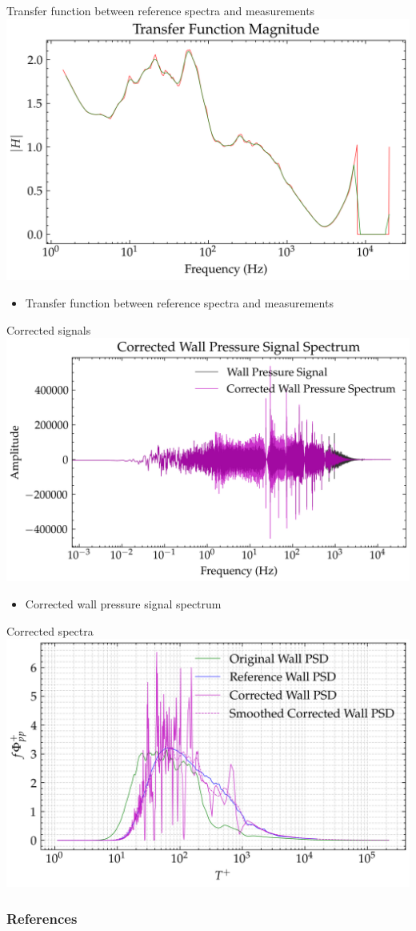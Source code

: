 \documentclass[aspectratio=169]{beamer}
\begin{document}
\begin{frame}{Transfer function between reference spectra and measurements}
    \centering
    \includegraphics[width=0.7\linewidth]{figures/transfer_function_magnitude.png}
    \begin{itemize}
        \item Transfer function between reference spectra and measurements
    \end{itemize}
\end{frame}

\begin{frame}{Corrected signals}
    \centering
    \includegraphics[width=0.7\linewidth]{figures/corrected_wall_pressure_signal_spectrum.png}
    \begin{itemize}
        \item Corrected wall pressure signal spectrum
    \end{itemize}
\end{frame}

\begin{frame}{Corrected spectra}
    \includegraphics[width=0.7\linewidth]{figures/corrected_wall_pressure_spectrum.png}
\end{frame}

\begin{frame}
    \frametitle{References}
    
    
\end{frame}

% 
\end{document}
